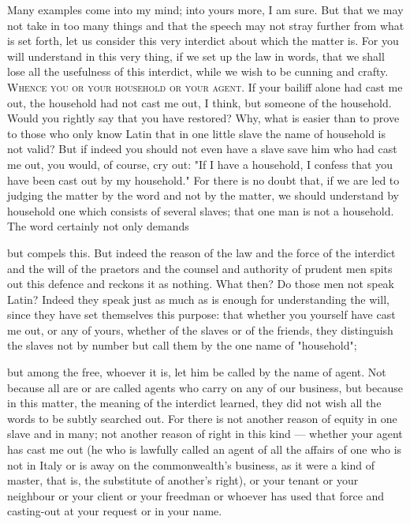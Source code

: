  Many examples come into my mind; into yours more, I am sure. But that we may not take in too many things and that the speech may not stray further from what is set forth, let us consider this very interdict about which the matter is. For you will understand in this very thing, if we set up the law in words, that we shall lose all the usefulness of this interdict, while we wish to be cunning and crafty. \textsc{Whence you or your household or your agent}. If your bailiff alone had cast me out, the household had not cast me out, I think, but someone of the household. Would you rightly say that you have restored? Why, what is easier than to prove to those who only know Latin that in one little slave the name of household is not valid? But if indeed you should not even have a slave save him who had cast me out, you would, of course, cry out: "If I have a household, I confess that you have been cast out by my household." For there is no doubt that, if we are led to judging the matter by the word and not by the matter, we should understand by household one which consists of several slaves; that one man is not a household. The word certainly not only demands

 but compels this. But indeed the reason of the law and the force of the interdict and the will of the praetors and the counsel and authority of prudent men spits out this defence and reckons it as nothing. What then? Do those men not speak Latin? Indeed they speak just as much as is enough for understanding the will, since they have set themselves this purpose: that whether you yourself have cast me out, or any of yours, whether of the slaves or of the friends, they distinguish the slaves not by number but call them by the one name of "household";

 but among the free, whoever it is, let him be called by the name of agent. Not because all are or are called agents who carry on any of our business, but because in this matter, the meaning of the interdict learned, they did not wish all the words to be subtly searched out. For there is not another reason of equity in one slave and in many; not another reason of right in this kind --- whether your agent has cast me out (he who is lawfully called an agent of all the affairs of one who is not in Italy or is away on the commonwealth's business, as it were a kind of master, that is, the substitute of another's right), or your tenant or your neighbour or your client or your freedman or whoever has used that force and casting-out at your request or in your name.

